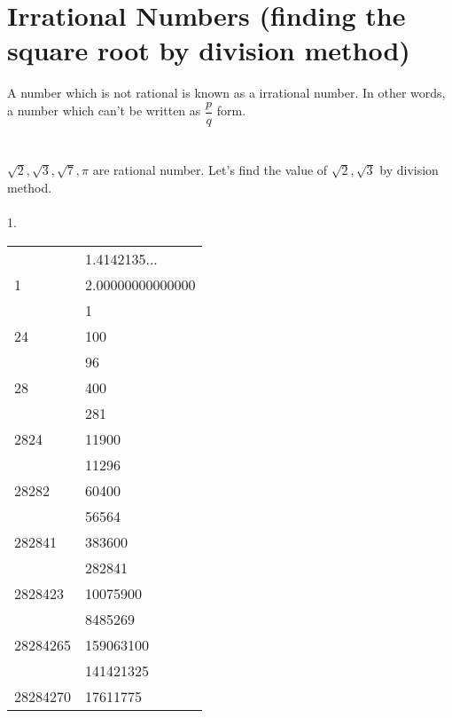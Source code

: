 \section{Irrational Numbers (finding the square root by
division method)}
A number which is not rational is known as a irrational number. In other
words, a number which can’t be written as $\dfrac{p}{q}$ form.\\
\\\\
$\sqrt{2},\sqrt{3},\sqrt{7},\pi$ are rational number.
Let’s find the value of $\sqrt{2},\sqrt{3}$ by division method.\\\\
1.\\
\begin{center}
\begin{tabular}{l|l } 
 
       & 1.4142135... \\\cline{2-2}
1      & 2.00000000000000 \\
       & 1 \\\cline{2-2} 
24     & 100\\ 
       &{\hspace{2mm}96}\\\cline{2-2} 
28     &{\hspace{4mm}400}\\
       &{\hspace{4mm}281}\\\cline{2-2}
2824   &{\hspace{4mm}11900}\\
       &{\hspace{4mm}11296}\\\cline{2-2} 
28282  &{\hspace{8mm}60400}\\ 
       &{\hspace{8mm}56564}\\\cline{2-2} 
282841 &{\hspace{10mm}383600}\\ 
       &{\hspace{10mm}282841}\\\cline{2-2}
2828423&{\hspace{10mm}10075900}\\ 
       &{\hspace{10mm}8485269}\\\cline{2-2}
28284265&{\hspace{10mm}159063100}\\
       &{\hspace{10mm}141421325}\\\cline{2-2} 
28284270&{\hspace{12mm}17611775}                              
\end{tabular}
\end{center}
